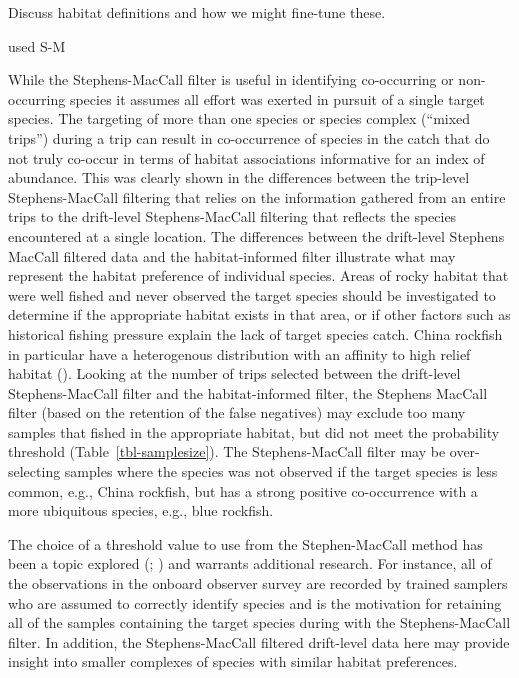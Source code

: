 \documentclass[
  12pt,
  authoryear,
  preprint,
  3p]{elsarticle}
\begin{document}
Discuss habitat definitions and how we might fine-tune these.

\citet{DucharmeBarth:2018:IAG} used S-M \citet{Okamura:2018:TCS}

While the Stephens-MacCall filter is useful in identifying co-occurring
or non-occurring species it assumes all effort was exerted in pursuit of
a single target species. The targeting of more than one species or
species complex (``mixed trips'') during a trip can result in
co-occurrence of species in the catch that do not truly co-occur in
terms of habitat associations informative for an index of abundance.
This was clearly shown in the differences between the trip-level
Stephens-MacCall filtering that relies on the information gathered from
an entire trips to the drift-level Stephens-MacCall filtering that
reflects the species encountered at a single location. The differences
between the drift-level Stephens MacCall filtered data and the
habitat-informed filter illustrate what may represent the habitat
preference of individual species. Areas of rocky habitat that were well
fished and never observed the target species should be investigated to
determine if the appropriate habitat exists in that area, or if other
factors such as historical fishing pressure explain the lack of target
species catch. China rockfish in particular have a heterogenous
distribution with an affinity to high relief habitat
(\citet{Love:2002:RNP}). Looking at the number of trips selected between
the drift-level Stephens-MacCall filter and the habitat-informed filter,
the Stephens MacCall filter (based on the retention of the false
negatives) may exclude too many samples that fished in the appropriate
habitat, but did not meet the probability threshold
(Table~\ref{tbl-samplesize}). The Stephens-MacCall filter may be
over-selecting samples where the species was not observed if the target
species is less common, e.g., China rockfish, but has a strong positive
co-occurrence with a more ubiquitous species, e.g., blue rockfish.

The choice of a threshold value to use from the Stephen-MacCall method
has been a topic explored (\citet{Dettloff:2021:ISA};
\citet{Cope:2015:DMS}) and warrants additional research. For instance,
all of the observations in the onboard observer survey are recorded by
trained samplers who are assumed to correctly identify species and is
the motivation for retaining all of the samples containing the target
species during with the Stephens-MacCall filter. In addition, the
Stephens-MacCall filtered drift-level data here may provide insight into
smaller complexes of species with similar habitat preferences.
\end{document}
